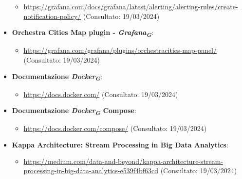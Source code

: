 \begin{itemize}
\begin{itemize}
        \item \url{https://grafana.com/docs/grafana/latest/alerting/alerting-rules/create-notification-policy/} (Consultato: 19/03/2024)
    \end{itemize}
    \item  \textbf{Orchestra Cities Map plugin - \textit{Grafana}\textsubscript{\textit{G}}}:
    \begin{itemize}
        \item \url{https://grafana.com/grafana/plugins/orchestracities-map-panel/} (Consultato: 19/03/2024)
    \end{itemize}
    \item \textbf{Documentazione \textit{Docker}\textsubscript{\textit{G}}}: 
    \begin{itemize}
        \item \url{https://docs.docker.com/} (Consultato: 19/03/2024)
    \end{itemize}
    \item \textbf{Documentazione \textit{Docker}\textsubscript{\textit{G}} Compose}: 
    \begin{itemize}
        \item \url{https://docs.docker.com/compose/} (Consultato: 19/03/2024)
    \end{itemize}
    \item \textbf{Kappa Architecture: Stream Processing in Big Data Analytics}: 
    \begin{itemize}
        \item \url{https://medium.com/data-and-beyond/kappa-architecture-stream-processing-in-big-data-analytics-e539f4bf63cd} (Consultato: 19/03/2024)
    \end{itemize}
\end{itemize}
